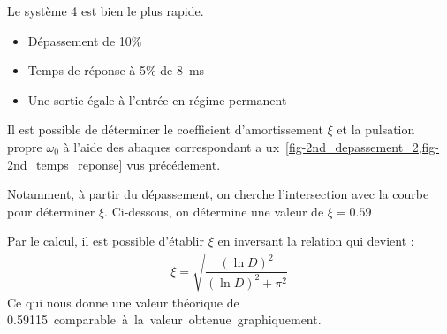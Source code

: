 Le système 4 est bien le plus rapide.
\begin{itemize}
    \item Dépassement de 10\%
    \item Temps de réponse à 5\% de \SI{8}{\milli\second}
    \item Une sortie égale à l'entrée en régime permanent 
\end{itemize}
Il est possible de déterminer le coefficient d'amortissement $\xi$ et la 
pulsation propre $\omega_0$ à l'aide des abaques correspondant a
ux~\cref{fig-2nd_depassement_2,fig-2nd_temps_reponse} vus précédement.

Notamment, à partir du dépassement, on cherche l'intersection avec la courbe
pour déterminer $\xi$. Ci-dessous, on détermine une valeur de $\xi=0.59$
\begin{center}

\end{center}
Par le calcul, il est possible d'établir $\xi$ en inversant la relation
 qui devient :
\begin{align*}
    \xi=\sqrt{\dfrac{(\ln D)^2}{(\ln D)^2+\pi^2}}
\end{align*}
Ce qui nous donne une valeur théorique de \SI{0.59115} comparable à la valeur
obtenue graphiquement.

